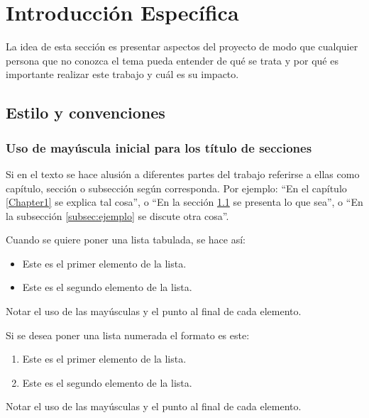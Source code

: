 \chapter{Introducción Específica} %

\label{Chapter2}

La idea de esta sección es presentar aspectos del proyecto de modo que cualquier persona que no conozca el tema pueda entender de qué se trata y por qué es importante realizar este trabajo y cuál es su impacto.
\section{Estilo y convenciones}
\label{sec:ejemplo}

\subsection{Uso de mayúscula inicial para los título de secciones}

Si en el texto se hace alusión a diferentes partes del trabajo referirse a ellas como capítulo, sección o subsección según corresponda. Por ejemplo: ``En el capítulo \ref{Chapter1} se explica tal cosa'', o ``En la sección \ref{sec:ejemplo} se presenta lo que sea'', o ``En la subsección \ref{subsec:ejemplo} se discute otra cosa''.

Cuando se quiere poner una lista tabulada, se hace así:

\begin{itemize}
	\item Este es el primer elemento de la lista.
	\item Este es el segundo elemento de la lista.
\end{itemize}

Notar el uso de las mayúsculas y el punto al final de cada elemento.

Si se desea poner una lista numerada el formato es este:

\begin{enumerate}
	\item Este es el primer elemento de la lista.
	\item Este es el segundo elemento de la lista.
\end{enumerate}

Notar el uso de las mayúsculas y el punto al final de cada elemento.

